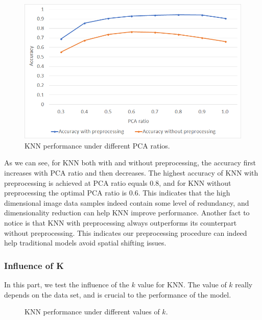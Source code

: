 \documentclass{article}
\begin{document}
\begin{figure}[!htb]
	\centering\includegraphics[width=.8\textwidth]{fig/KNN_PCA}
	\caption{KNN performance under different PCA ratios.}\label{fig:KNN_PCA}
\end{figure}

As we can see, for KNN both with and without preprocessing, the accuracy first increases with PCA ratio and then decreases. The highest accuracy of KNN with preprocessing is achieved at PCA ratio equals 0.8, and for KNN without preprocessing the optimal PCA ratio is 0.6. This indicates that the high dimensional image data samples indeed contain some level of redundancy, and dimensionality reduction can help KNN improve performance. Another fact to notice is that KNN with preprocessing always outperforms its counterpart without preprocessing. This indicates our preprocessing procedure can indeed help traditional models avoid spatial shifting issues.

\subsubsection{Influence of K}
In this part, we test the influence of the $k$ value for KNN. The value of $k$ really depends on the data set, and is crucial to the performance of the model.

\begin{figure}[!htb]
	\centering
	\hspace{.2in}
	\caption{KNN performance under different values of $k$.}\label{fig:KNN}
\end{figure}
\end{document}
